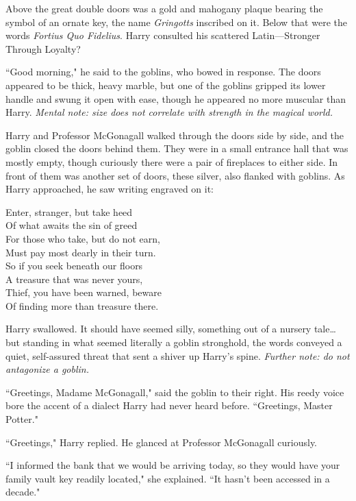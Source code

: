 Above the great double doors was a gold and mahogany plaque bearing the symbol of an ornate key, the name \emph{Gringotts} inscribed on it. Below that were the words \emph{Fortius Quo Fidelius}. Harry consulted his scattered Latin---Stronger Through Loyalty?

``Good morning," he said to the goblins, who bowed in response. The doors appeared to be thick, heavy marble, but one of the goblins gripped its lower handle and swung it open with ease, though he appeared no more muscular than Harry. \emph{Mental note: size does not correlate with strength in the magical world.}

Harry and Professor McGonagall walked through the doors side by side, and the goblin closed the doors behind them. They were in a small entrance hall that was mostly empty, though curiously there were a pair of fireplaces to either side. In front of them was another set of doors, these silver, also flanked with goblins. As Harry approached, he saw writing engraved on it:

\begin{inscription}
Enter, stranger, but take heed\\
Of what awaits the sin of greed\\
For those who take, but do not earn,\\
Must pay most dearly in their turn.\\
So if you seek beneath our floors\\
A treasure that was never yours,\\
Thief, you have been warned, beware\\
Of finding more than treasure there.
\end{inscription}

Harry swallowed. It should have seemed silly, something out of a nursery tale{\ldots} but standing in what seemed literally a goblin stronghold, the words conveyed a quiet, self-assured threat that sent a shiver up Harry's spine. \emph{Further note: do not antagonize a goblin.}

``Greetings, Madame McGonagall," said the goblin to their right. His reedy voice bore the accent of a dialect Harry had never heard before. ``Greetings, Master Potter."

``Greetings," Harry replied. He glanced at Professor McGonagall curiously.

``I informed the bank that we would be arriving today, so they would have your family vault key readily located," she explained. ``It hasn't been accessed in a decade."

